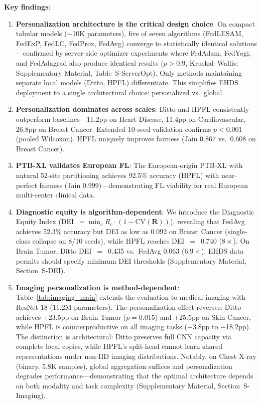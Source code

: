 \documentclass[conference]{IEEEtran}
\begin{document}
\textbf{Key findings}:

\begin{enumerate}
    \item \textbf{Personalization architecture is the critical design choice}: On compact tabular models ($\sim$10K parameters), five of seven algorithms (FedLESAM, FedExP, FedLC, FedProx, FedAvg) converge to statistically identical solutions---confirmed by server-side optimizer experiments where FedAdam, FedYogi, and FedAdagrad also produce identical results ($p{>}0.9$, Kruskal--Wallis; Supplementary Material, Table~S-ServerOpt). Only methods maintaining separate local models (Ditto, HPFL) differentiate. This simplifies EHDS deployment to a single architectural choice: personalized vs.\ global.

    \item \textbf{Personalization dominates across scales}: Ditto and HPFL consistently outperform baselines---11.2pp on Heart Disease, 11.4pp on Cardiovascular, 26.8pp on Breast Cancer. Extended 10-seed validation confirms $p < 0.001$ (pooled Wilcoxon). HPFL uniquely improves fairness (Jain 0.867 vs.\ 0.608 on Breast Cancer).

    \item \textbf{PTB-XL validates European FL}: The European-origin PTB-XL with natural 52-site partitioning achieves 92.5\% accuracy (HPFL) with near-perfect fairness (Jain 0.999)---demonstrating FL viability for real European multi-center clinical data.

    \item \textbf{Diagnostic equity is algorithm-dependent}: We introduce the Diagnostic Equity Index (DEI~$= \min_c R_c \cdot (1 - \text{CV}(\mathbf{R}))$), revealing that FedAvg achieves 52.3\% accuracy but DEI as low as 0.092 on Breast Cancer (single-class collapse on 8/10 seeds), while HPFL reaches DEI~$=$~0.740 ($8\times$). On Brain Tumor, Ditto DEI~$=$~0.435 vs.\ FedAvg 0.063 ($6.9\times$). EHDS data permits should specify minimum DEI thresholds (Supplementary Material, Section~S-DEI).

    \item \textbf{Imaging personalization is method-dependent}: Table~\ref{tab:imaging_main} extends the evaluation to medical imaging with ResNet-18 (11.2M parameters). The personalization effect reverses: Ditto achieves $+$23.5pp on Brain Tumor ($p{=}0.015$) and $+$25.5pp on Skin Cancer, while HPFL is counterproductive on all imaging tasks ($-$3.8pp to $-$18.2pp). The distinction is architectural: Ditto preserves full CNN capacity via complete local copies, while HPFL's split-head cannot learn shared representations under non-IID imaging distributions. Notably, on Chest X-ray (binary, 5.8K samples), global aggregation suffices and personalization degrades performance---demonstrating that the optimal architecture depends on both modality and task complexity (Supplementary Material, Section~S-Imaging).
\end{enumerate}
\end{document}
